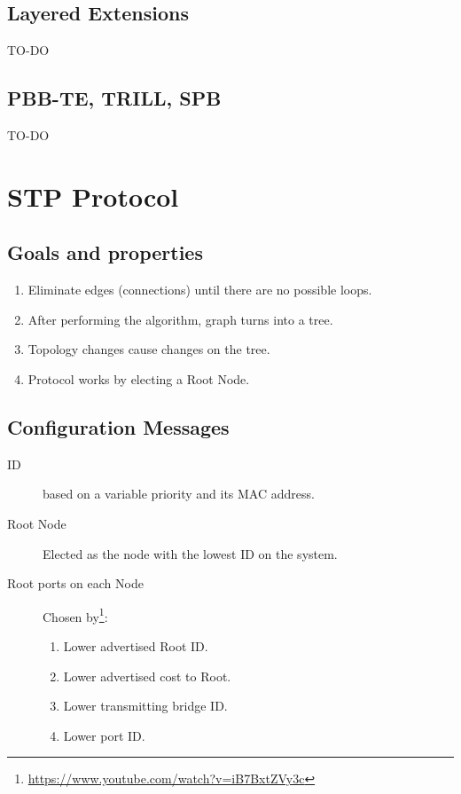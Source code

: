 \documentclass{article}
\begin{document}
\subsection{Layered Extensions}

TO-DO

\subsection{PBB-TE, TRILL, SPB}

TO-DO


\newpage









\section{STP Protocol}

\subsection{Goals and properties}

\begin{enumerate}
    \item Eliminate edges (connections) until there are no possible loops.
    \item After performing the algorithm, graph turns into a tree.
    \item Topology changes cause changes on the tree.
    \item Protocol works by electing a Root Node.
\end{enumerate}



\subsection{Configuration Messages}

\begin{description}
    \item[ID] based on a variable priority and its MAC address.
    \item[Root Node] Elected as the node with the lowest ID on the system.
    \item[Root ports on each Node] Chosen by\footnote{\url{https://www.youtube.com/watch?v=iB7BxtZVy3c}}:
    \begin{enumerate}
   		\item Lower advertised Root ID.
   		\item Lower advertised cost to Root.
   		\item Lower transmitting bridge ID.
   		\item Lower  port ID.
	\end{enumerate}
\end{description}
\end{document}
